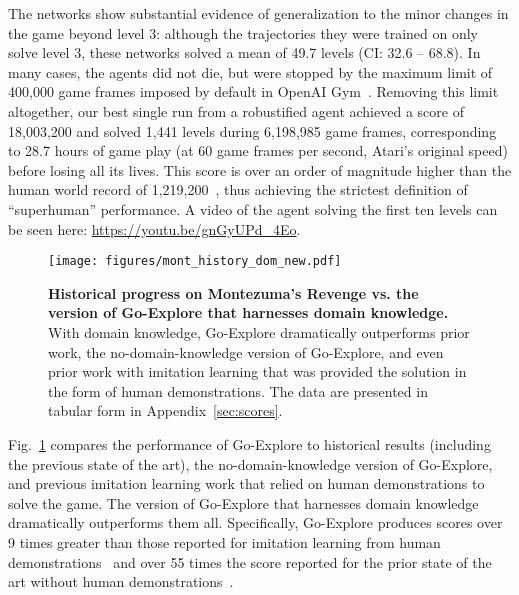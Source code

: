 \documentclass{article}
\newcommand{\pivotci}[2]{(CI: #1 -- #2)}  \newcommand{\percci}[2]{}  \newcommand{\tpivotci}[2]{(#1 -- #2)}  \newcommand{\tpercci}[2]{}  \newcommand{\na}[0]{-}
\begin{document}
The networks show substantial evidence of generalization to the minor changes in the game beyond level 3: although the trajectories they were trained on only solve level 3, these networks solved a mean of 49.7 levels \pivotci{32.6}{68.8}\percci{29.5}{66.7}. In many cases, the agents did not die, but were stopped by the maximum limit of 400,000 game frames imposed by default in OpenAI Gym~\cite{brockman}. Removing this limit altogether, our best single run from a robustified agent achieved a score of 18,003,200 and solved 1,441 levels during 6,198,985 game frames, corresponding to 28.7 hours of game play (at 60 game frames per second, Atari's original speed) before losing all its lives. This score is over an order of magnitude higher than the human world record of 1,219,200~\cite{atari_scoreboard}, thus achieving the strictest definition of ``superhuman'' performance. A video of the agent solving the first ten levels can be seen here: \url{https://youtu.be/gnGyUPd_4Eo}.

\begin{figure}
    \centering
    \texttt{[image: figures/mont\_history\_dom\_new.pdf]}
    \caption{\textbf{Historical progress on Montezuma's Revenge vs. the version of Go-Explore that harnesses domain knowledge.} With domain knowledge, Go-Explore dramatically outperforms prior work, the no-domain-knowledge version of Go-Explore, and even prior work with imitation learning that was provided the solution in the form of human demonstrations. The data are presented in tabular form in Appendix~\ref{sec:scores}.}
    \label{fig:mont_history_dom}
\end{figure}

Fig.~\ref{fig:mont_history_dom} compares the performance of Go-Explore to historical results (including the previous state of the art), the no-domain-knowledge version of Go-Explore, and previous imitation learning work that relied on human demonstrations to solve the game. The version of Go-Explore that harnesses domain knowledge dramatically outperforms them all. Specifically, Go-Explore produces scores over 9 times greater than those reported for imitation learning from human demonstrations~\cite{salimans2018learning} and over 55 times the score reported for the prior state of the art 
without human demonstrations~\cite{Choi2018ContingencyAwareEI}.
\end{document}
